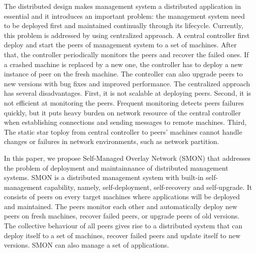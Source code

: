 The distributed design makes management system a distributed
application in essential and it introduces an important
problem: the management system need to be deployed first and
maintained continually through its lifecycle. Currently,
this problem is addressed by using centralized approach. A
central controller first deploy and start the peers of
management system to a set of machines. After that, the
controller periodically monitors the peers and recover the
failed ones. If a crashed machine is replaced by a new one,
the controller has to deploy a new instance of peer on the
fresh machine. The controller can also upgrade peers to new
versions with bug fixes and improved performance. The
centralized approach has several disadvantages. First, it is
not scalable at deploying peers. Second, it is not efficient
at monitoring the peers. Frequent monitoring detects peers
failures quickly, but it puts heavy burden on network
resource of the central controller when establishing
connections and sending messages to remote machines. Third,
The static star toploy from central controller to peers'
machines cannot handle changes or failures in network
environments, such as network partition.

In this paper, we propose Self-Managed Overlay Network
(SMON) that addresses the problem of deployment and
maintainnance of distributed management systems. SMON is a
distributed management system with built-in self-management
capability, namely, self-deployment, self-recovery and
self-upgrade. It consists of peers on every target machines
where applications will be deployed and maintained. The
peers monitor each other and automatically deploy new peers
on fresh machines, recover failed peers, or upgrade peers of
old versions. The collective behaviour of all peers gives
rise to a distributed system that can deploy itself to a set
of machines, recover failed peers and update itself to new
versions. SMON can also manage a set of applications.




